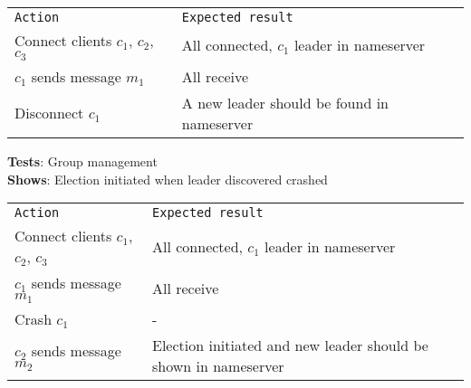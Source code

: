 	\begin{tabular}{ll}
		\texttt{Action} & \texttt{Expected result} \\
		Connect clients $c_1$, $c_2$, $c_3$ & All connected, $c_1$ leader in nameserver \\
		$c_1$ sends message $m_1$ & All receive \\
		Disconnect $c_1$ & A new leader should be found in nameserver \\
	\end{tabular}

	\newpage
	\textbf{Tests}: Group management \\
	\textbf{Shows}: Election initiated when leader discovered crashed \\

	\begin{tabular}{ll}
		\texttt{Action} & \texttt{Expected result} \\
		Connect clients $c_1$, $c_2$, $c_3$ & All connected, $c_1$ leader in nameserver \\
		$c_1$ sends message $m_1$ & All receive \\
		Crash $c_1$ & - \\
		$c_2$ sends message $m_2$ & Election initiated and new leader should be shown in nameserver \\
	\end{tabular}







